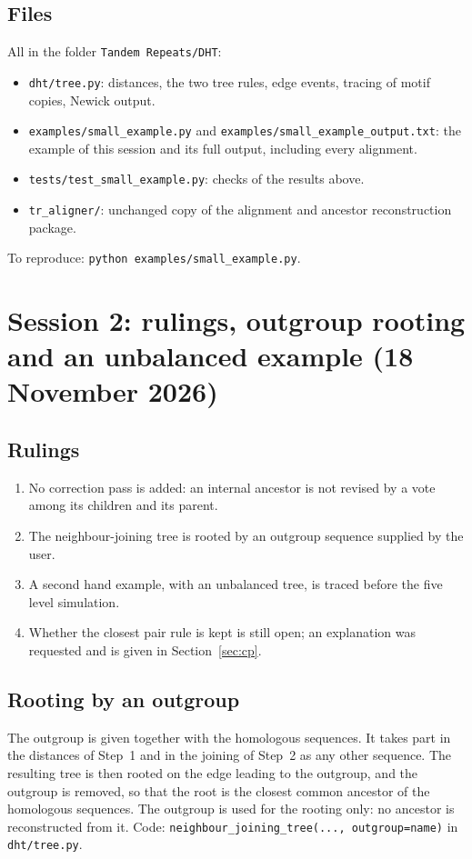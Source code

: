 \documentclass[11pt,a4paper]{article}
\begin{document}
\subsection{Files}
All in the folder \texttt{Tandem Repeats/DHT}:
\begin{itemize}
\item \texttt{dht/tree.py}: distances, the two tree rules, edge events, tracing of motif copies,
  Newick output.
\item \texttt{examples/small\_example.py} and \texttt{examples/small\_example\_output.txt}: the
  example of this session and its full output, including every alignment.
\item \texttt{tests/test\_small\_example.py}: checks of the results above.
\item \texttt{tr\_aligner/}: unchanged copy of the alignment and ancestor reconstruction package.
\end{itemize}
To reproduce: \texttt{python examples/small\_example.py}.

\section{Session 2: rulings, outgroup rooting and an unbalanced example (18 November 2026)}

\subsection{Rulings}
\begin{enumerate}
\item No correction pass is added: an internal ancestor is not revised by a vote among its
  children and its parent.
\item The neighbour-joining tree is rooted by an outgroup sequence supplied by the user.
\item A second hand example, with an unbalanced tree, is traced before the five level
  simulation.
\item Whether the closest pair rule is kept is still open; an explanation was requested and is
  given in Section~\ref{sec:cp}.
\end{enumerate}

\subsection{Rooting by an outgroup}
The outgroup is given together with the homologous sequences. It takes part in the distances of
Step~1 and in the joining of Step~2 as any other sequence. The resulting tree is then rooted on
the edge leading to the outgroup, and the outgroup is removed, so that the root is the closest
common ancestor of the homologous sequences. The outgroup is used for the rooting only: no
ancestor is reconstructed from it. Code: \texttt{neighbour\_joining\_tree(..., outgroup=name)}
in \texttt{dht/tree.py}.
\end{document}

